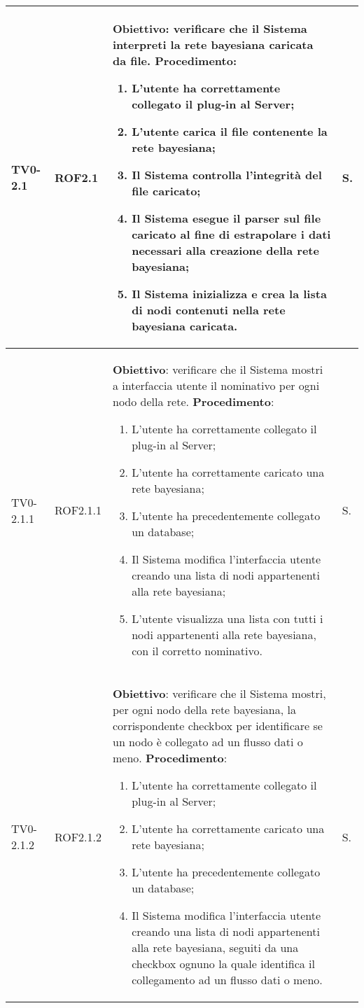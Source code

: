 \begin{longtable}{|C{.15\textwidth}|C{.13\textwidth}|m{.65\textwidth}|C{.08\textwidth}|}
TV0-2.1 & ROF2.1 &
	\textbf{Obiettivo}: verificare che il Sistema interpreti la rete bayesiana caricata da file. \newline
	\textbf{Procedimento}:
	\begin{enumerate}
		\item L'utente ha correttamente collegato il plug-in al Server;
		\item L'utente carica il file contenente la rete bayesiana;
		\item Il Sistema controlla l'integrità del file caricato;
		\item Il Sistema esegue il parser sul file caricato al fine di estrapolare i dati necessari alla creazione della rete bayesiana;
		\item Il Sistema inizializza e crea la lista di nodi contenuti nella rete bayesiana caricata.
	\end{enumerate}
	& S. \\
\hline

TV0-2.1.1 & ROF2.1.1 &
	\textbf{Obiettivo}: verificare che il Sistema mostri a interfaccia utente il nominativo per ogni nodo della rete. \newline
	\textbf{Procedimento}:
	\begin{enumerate}
		\item L'utente ha correttamente collegato il plug-in al Server;
		\item L'utente ha correttamente caricato una rete bayesiana;
		\item L'utente ha precedentemente collegato un database;
		\item Il Sistema modifica l'interfaccia utente creando una lista di nodi appartenenti alla rete bayesiana;
		\item L'utente visualizza una lista con tutti i nodi appartenenti alla rete bayesiana, con il corretto nominativo.
	\end{enumerate}
	& S. \\
\hline

TV0-2.1.2 & ROF2.1.2&
	\textbf{Obiettivo}: verificare che il Sistema mostri, per ogni nodo della rete bayesiana, la corrispondente checkbox per identificare se un nodo è collegato ad un flusso dati o meno. \newline
	\textbf{Procedimento}:
	\begin{enumerate}
		\item L'utente ha correttamente collegato il plug-in al Server;
		\item L'utente ha correttamente caricato una rete bayesiana;
		\item L'utente ha precedentemente collegato un database;
		\item Il Sistema modifica l'interfaccia utente creando una lista di nodi appartenenti alla rete bayesiana, seguiti da una checkbox ognuno la quale identifica il collegamento ad un flusso dati o meno.
	\end{enumerate}
	& S. \\
\hline


\end{longtable}
